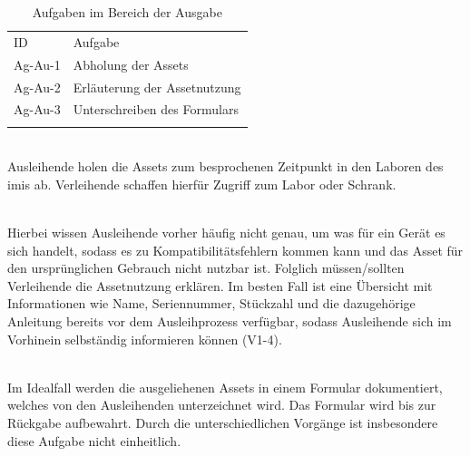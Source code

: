 \begin{table}[h]
        \centering
        \caption{Aufgaben im Bereich der Ausgabe}
        \begin{tabular}{ll}
                \arrayrulecolor{maincolor}\hline
                \sffamily\color{maincolor}ID & \sffamily\color{maincolor}Aufgabe
                \\
                \arrayrulecolor{maincolor}\hline
                Ag-Au-1                      & Abholung der Assets
                \\
                Ag-Au-2                      & Erläuterung der Assetnutzung
                \\
                Ag-Au-3                      & Unterschreiben des Formulars
                \\
                \arrayrulecolor{maincolor}\hline
        \end{tabular}
        \label{table:Ag-Au}
\end{table}

{\sffamily\color{maincolor}{Ag-Au-1 | Abholung der Assets}}\\
Ausleihende holen die Assets zum besprochenen Zeitpunkt in den Laboren des
\ac{imis} ab. Verleihende schaffen hierfür Zugriff zum Labor oder Schrank.

        {\sffamily\color{maincolor}{Ag-Au-2 | Erläuterung der Assetnutzung}}\\
Hierbei wissen Ausleihende vorher häufig nicht genau, um was für ein Gerät es
sich handelt, sodass es zu Kompatibilitätsfehlern kommen kann und das Asset für
den ursprünglichen Gebrauch nicht nutzbar ist. Folglich müssen/sollten
Verleihende die Assetnutzung erklären. Im besten Fall ist eine Übersicht mit
Informationen wie Name, Seriennummer, Stückzahl und die dazugehörige Anleitung
bereits vor dem Ausleihprozess verfügbar, sodass Ausleihende sich im Vorhinein
selbständig informieren können (V1-4).

        {\sffamily\color{maincolor}{Ag-Au-3 | Unterschreiben des Formulars}}\\
Im Idealfall werden die ausgeliehenen Assets in einem Formular dokumentiert,
welches von den Ausleihenden unterzeichnet wird. Das Formular wird bis zur
Rückgabe aufbewahrt. Durch die unterschiedlichen Vorgänge ist insbesondere diese
Aufgabe nicht einheitlich.

